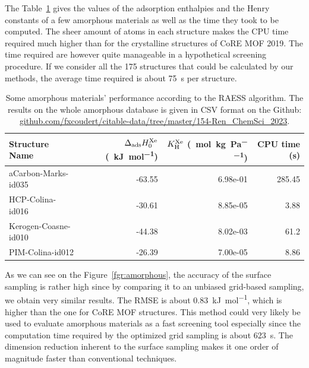 \documentclass[main]{subfiles}
\begin{document}
The Table~\ref{tab:amorphous} gives the values of the adsorption enthalpies and the Henry constants of a few amorphous materials as well as the time they took to be computed. The sheer amount of atoms in each structure makes the CPU time required much higher than for the crystalline structures of CoRE MOF 2019. The time required are however quite manageable in a hypothetical screening procedure. If we consider all the 175 structures that could be calculated by our methods, the average time required is about \SI{75}{\second} per structure. 

\begin{table}[hb]
\begin{tabular}{|l|r|r|r|}
\hline
 Structure Name & $\Delta_{\text{ads}}H_{\text{0}}^{\text{Xe}}$ (\SI{}{\kilo\joule\per\mole}) & $K_{\text{H}}^{\text{Xe}}$ (\SI{}{\mole\per\kilo\gram\per\pascal}) & CPU time (s) \\
\hline
aCarbon-Marks-id035 &                 -63.55 &            6.98e-01 & 285.45 \\
HCP-Colina-id016 &                 -30.61 &            8.85e-05 & 3.88 \\
Kerogen-Coasne-id010 &                 -44.38 &            8.02e-03 & 61.2 \\
PIM-Colina-id012 &                 -26.39 &            7.00e-05 & 8.86 \\
\hline
\end{tabular}
\caption{Some amorphous materials' performance according to the RAESS algorithm. The results on the whole amorphous database is given in CSV format on the Github: \url{github.com/fxcoudert/citable-data/tree/master/154-Ren_ChemSci_2023}.}\label{tab:amorphous}
\end{table}

As we can see on the Figure~\ref{fgr:amorphous}, the accuracy of the surface sampling is rather high since by comparing it to an unbiased grid-based sampling, we obtain very similar results. The RMSE is about \SI{0.83}{\kJ\per\mol}, which is higher than the one for CoRE MOF structures. This method could very likely be used to evaluate amorphous materials as a fast screening tool especially since the computation time required by the optimized grid sampling is about \SI{623}{\second}. The dimension reduction inherent to the surface sampling makes it one order of magnitude faster than conventional techniques.
\end{document}
